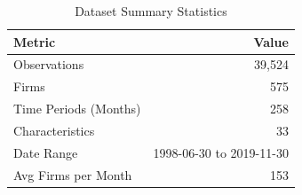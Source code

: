 \begin{table}[!ht]
\centering
\caption{Dataset Summary Statistics}
\label{tab:data_summary}
\begin{tabular}{l r}
\hline
Metric & Value \\
\hline
Observations & 39,524 \\
Firms & 575 \\
Time Periods (Months) & 258 \\
Characteristics & 33 \\
Date Range & 1998-06-30 to 2019-11-30 \\
Avg Firms per Month & 153 \\
\hline
\end{tabular}
\end{table}
